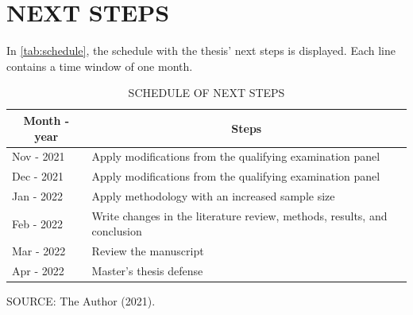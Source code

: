 \section{NEXT STEPS}

In \autoref{tab:schedule}, the schedule with the thesis' next steps is displayed. Each line contains a time window of one month.

\begin{table}[!htbp]
    \footnotesize
    \captionsetup{justification=raggedright,
        singlelinecheck=false,
        font=footnotesize}
    \caption{SCHEDULE OF NEXT STEPS}
    \centering
    \begin{tabular}{ll}
        \hline
        \multicolumn{1}{c}{\textbf{Month - year}} & \multicolumn{1}{c}{\textbf{Steps}} \\
        \hline
        Nov - 2021 & Apply modifications from the qualifying examination panel \\
        Dec - 2021 & Apply modifications from the qualifying examination panel \\
        Jan - 2022 & Apply methodology with an increased sample size           \\
        Feb - 2022 & Write changes in the literature review, methods, results, and conclusion                                                             \\
        Mar - 2022 & Review the manuscript                                     \\
        Apr - 2022 & Master's thesis defense                                   \\
        \hline
    \end{tabular}
    \label{tab:schedule}
    \par \vspace{2mm} \footnotesize \raggedright
    SOURCE: The Author (2021).
\end{table}